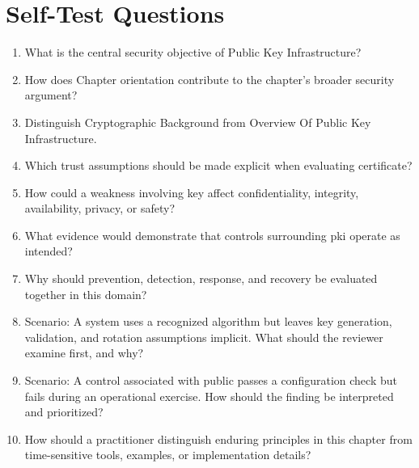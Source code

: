 \documentclass[11pt]{article}
\begin{document}
\section*{Self-Test Questions}
\begin{enumerate}
\item What is the central security objective of Public Key Infrastructure?
\item How does Chapter orientation contribute to the chapter's broader security argument?
\item Distinguish Cryptographic Background from Overview Of Public Key Infrastructure.
\item Which trust assumptions should be made explicit when evaluating certificate?
\item How could a weakness involving key affect confidentiality, integrity, availability, privacy, or safety?
\item What evidence would demonstrate that controls surrounding pki operate as intended?
\item Why should prevention, detection, response, and recovery be evaluated together in this domain?
\item Scenario: A system uses a recognized algorithm but leaves key generation, validation, and rotation assumptions implicit. What should the reviewer examine first, and why?
\item Scenario: A control associated with public passes a configuration check but fails during an operational exercise. How should the finding be interpreted and prioritized?
\item How should a practitioner distinguish enduring principles in this chapter from time-sensitive tools, examples, or implementation details?
\end{enumerate}
\end{document}
